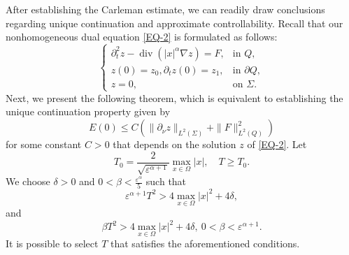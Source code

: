 \documentclass[11pt]{article}
\numberwithin{equation}{section}
\def\pt{\partial}
\def\e{\varepsilon }
\def\pt{\partial}
\def\Om{\Omega}
\def\al{\alpha}
\def\be{\beta}
\def\de{\delta}
\def\f{\frac}
\DeclareMathOperator{\Div}{div}
\begin{document}
		After establishing the Carleman estimate, we can readily draw conclusions regarding unique continuation and approximate controllability. Recall that our nonhomogeneous dual equation \eqref{EQ-2} is formulated as follows:
		\begin{equation*}
			\begin{cases}
				\pt_t^2z-\Div(|x|^\al \nabla z)=F, &\mbox{in } Q,\\
				z(0)=z_0, \pt_tz(0)=z_1, &\mbox{in }\pt Q,\\
				z=0, &\mbox{on }\Sigma.
			\end{cases}
		\end{equation*}
		Next, we present the following theorem, which is equivalent to establishing the unique continuation property given by
		\begin{equation}\label{10.03.1}
			E(0)\leq C\left( \|\pt_\nu z\|_{L^2(\Sigma)}+\|F\|_{L^2(Q)}^2\right)
		\end{equation}
		for some constant $C>0$ that  depends on the solution $z$ of \eqref{EQ-2}. Let
		\begin{equation*}
			T_0=\f{2}{\sqrt{\e^{\al+1}}}\max_{x\in\Om}|x|,\quad T\geq T_0.
		\end{equation*}
		We choose $\de>0$ and $0<\be<\f{\e^\al}{5}$ such that
		\begin{equation*}
			\e^{\al+1}T^2>4\max_{x\in \Om}|x|^2+4\de,
		\end{equation*}
		and
		\begin{equation*}
			\be T^2>4\max_{x\in\Om}|x|^2+4\de, \ 0<\be <\e^{\al+1}.
		\end{equation*}
		It is possible to select $T$ that satisfies the aforementioned conditions.
		
\end{document}
